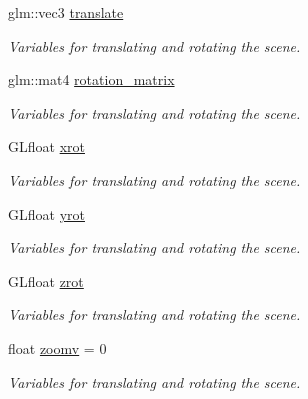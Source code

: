 {\bf }\par
\begin{DoxyCompactItemize}
\item 
glm\+::vec3 \hyperlink{classcft_1_1Scene_a58a6df7fd5277e8e9ca4e73bec0eb565}{translate}\hypertarget{classcft_1_1Scene_a58a6df7fd5277e8e9ca4e73bec0eb565}{}\label{classcft_1_1Scene_a58a6df7fd5277e8e9ca4e73bec0eb565}

\begin{DoxyCompactList}\small\item\em Variables for translating and rotating the scene. \end{DoxyCompactList}\item 
glm\+::mat4 \hyperlink{classcft_1_1Scene_a54aeaffbd20e825e850ef38c1586e257}{rotation\+\_\+matrix}\hypertarget{classcft_1_1Scene_a54aeaffbd20e825e850ef38c1586e257}{}\label{classcft_1_1Scene_a54aeaffbd20e825e850ef38c1586e257}

\begin{DoxyCompactList}\small\item\em Variables for translating and rotating the scene. \end{DoxyCompactList}\item 
G\+Lfloat \hyperlink{classcft_1_1Scene_a25254ead26ce3efe65d4719dd8624272}{xrot}\hypertarget{classcft_1_1Scene_a25254ead26ce3efe65d4719dd8624272}{}\label{classcft_1_1Scene_a25254ead26ce3efe65d4719dd8624272}

\begin{DoxyCompactList}\small\item\em Variables for translating and rotating the scene. \end{DoxyCompactList}\item 
G\+Lfloat \hyperlink{classcft_1_1Scene_a68f7a6f9f750cbea7be01fca153353cd}{yrot}\hypertarget{classcft_1_1Scene_a68f7a6f9f750cbea7be01fca153353cd}{}\label{classcft_1_1Scene_a68f7a6f9f750cbea7be01fca153353cd}

\begin{DoxyCompactList}\small\item\em Variables for translating and rotating the scene. \end{DoxyCompactList}\item 
G\+Lfloat \hyperlink{classcft_1_1Scene_a6c9f46de033985f342195a3554a4885d}{zrot}\hypertarget{classcft_1_1Scene_a6c9f46de033985f342195a3554a4885d}{}\label{classcft_1_1Scene_a6c9f46de033985f342195a3554a4885d}

\begin{DoxyCompactList}\small\item\em Variables for translating and rotating the scene. \end{DoxyCompactList}\item 
float \hyperlink{classcft_1_1Scene_a363fd71dbe28493efd475c9358696069}{zoomv} = 0\hypertarget{classcft_1_1Scene_a363fd71dbe28493efd475c9358696069}{}\label{classcft_1_1Scene_a363fd71dbe28493efd475c9358696069}

\begin{DoxyCompactList}\small\item\em Variables for translating and rotating the scene. \end{DoxyCompactList}\end{DoxyCompactItemize}

